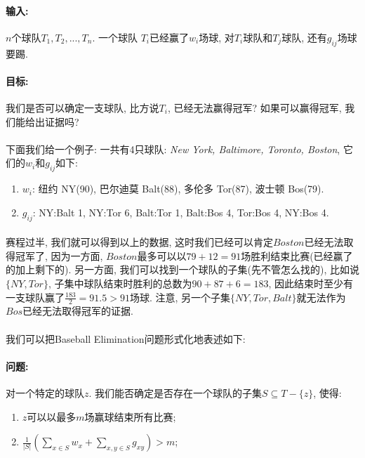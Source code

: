         \paragraph{输入:}$n$个球队$T_1, T_2, ..., T_n$. 一个球队 $T_i$已经赢了$w_i$场球, 对$T_i$球队和$T_j$球队, 还有$g_{ij}$场球要踢.
        \paragraph{目标:}我们是否可以确定一支球队, 比方说$T_i$, 已经无法赢得冠军? 如果可以赢得冠军, 我们能给出证据吗?
        \paragraph{}下面我们给一个例子: 一共有4只球队: \textit{New York, Baltimore, Toronto, Boston}, 它们的$w_i$和$g_{ij}$如下:
        \begin{enumerate}
 \item $w_i$: 纽约 NY(90), 巴尔迪莫 Balt(88), 多伦多 Tor(87), 波士顿 Bos(79).
 \item $g_{ij}$: NY:Balt 1, NY:Tor 6, Balt:Tor 1, Balt:Bos 4, Tor:Bos 4, NY:Bos 4.
        \end{enumerate}
        \paragraph{}赛程过半, 我们就可以得到以上的数据, 这时我们已经可以肯定$Boston$已经无法取得冠军了, 因为一方面, $Boston$最多可以以$79+12=91$场胜利结束比赛(已经赢了的加上剩下的). 另一方面, 我们可以找到一个球队的子集(先不管怎么找的), 比如说$\{ NY, Tor \}$, 子集中球队结束时胜利的总数为$90+87+6 = 183$, 因此结束时至少有一支球队赢了$\frac{183}{2}=91.5 > 91$场球. 注意, 另一个子集$\{NY, Tor, Balt\}$就无法作为$Bos$已经无法取得冠军的证据.
        \paragraph{}我们可以把{\sc Baseball Elimination}问题形式化地表述如下:
        \paragraph{问题:} 对一个特定的球队$z$. 我们能否确定是否存在一个球队的子集$S \subseteq T-\{z\}$, 使得:
        \begin{enumerate}
 \item $z$可以以最多$m$场赢球结束所有比赛;
 \item $\frac{1}{|S|} ( \sum\nolimits_{x\in S} w_x + \sum\nolimits_{x,y\in S} g_{xy} )> m $;
        \end{enumerate}
